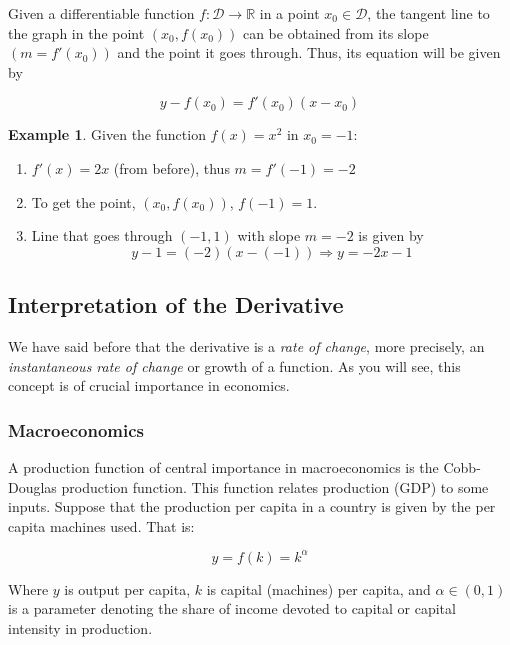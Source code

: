 \documentclass[11pt]{article}
\providecommand{\tightlist}{%
      \setlength{\itemsep}{0pt}\setlength{\parskip}{0pt}}
\theoremstyle{definition}
\newtheorem{example}{Example}
\theoremstyle{plain}
\begin{document}
Given a differentiable function \(f : \mathcal{D}\rightarrow\mathbb{R}\)
in a point \(x_0\in\mathcal{D}\), the tangent line to the graph in the
point \(\left(x_0, f(x_0)\right)\) can be obtained from its slope
\((m = f'(x_0))\) and the point it goes through. Thus, its equation will
be given by

\[
y - f(x_0) = f'(x_0)(x - x_0)
\]

\begin{example}
Given the function \(f(x) = x^2\) in \(x_0 = -1\):

\begin{enumerate}
\def\labelenumi{\arabic{enumi}.}
\tightlist
\item
  \(f'(x) = 2x\) (from before), thus \(m = f'(-1) = -2\)
\item
  To get the point, \(\left(x_0, f(x_0)\right)\), \(f(-1) = 1\).
\item
  Line that goes through \((-1,1)\) with slope \(m = -2\) is given by \[
  y-1 = (-2)(x-(-1)) \Rightarrow y = -2x -1
  \]
\end{enumerate}
\end{example}

\subsection{Interpretation of the
Derivative}\label{interpretation-of-the-derivative}

We have said before that the derivative is a \emph{rate of change}, more
precisely, an \emph{instantaneous rate of change} or growth of a
function. As you will see, this concept is of crucial importance in
economics.

\subsubsection{Macroeconomics}\label{macroeconomics}

A production function of central importance in macroeconomics is the
Cobb-Douglas production function. This function relates production (GDP)
to some inputs. Suppose that the production per capita in a country is
given by the per capita machines used. That is:

\[
y = f(k) = k^{\alpha}
\]

Where \(y\) is output per capita, \(k\) is capital (machines) per
capita, and \(\alpha\in(0,1)\) is a parameter denoting the share of
income devoted to capital or capital intensity in production.
\end{document}
